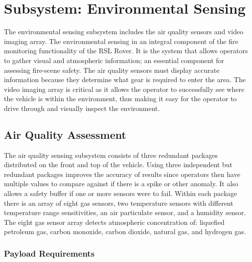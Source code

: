 \chapter{Subsystem: Environmental Sensing}

The environmental sensing subsystem includes the air quality sensors and video imaging array. The environmental sensing in an integral component of the fire monitoring functionality of the RSL Rover. It is the system that allows operators to gather visual and atmospheric information; an essential component for assessing fire-scene safety. The air quality sensors must display accurate information because they determine what gear is required to enter the area. The video imaging array is critical as it allows the operator to successfully see where the vehicle is within the environment, thus making it easy for the operator to drive through and visually inspect the environment. 

\section{Air Quality Assessment}

The air quality sensing subsystem consists of three redundant packages distributed on the front and top of the vehicle. Using three independent but redundant packages improves the accuracy of results since operators then have multiple values to compare against if there is a spike or other anomaly. It also allows a safety buffer if one or more sensors were to fail. Within each package there is an array of eight gas sensors, two temperature sensors with different temperature range sensitivities, an air particulate sensor, and a humidity sensor. The eight gas sensor array detects atmospheric concentration of: liquefied petroleum gas, carbon monoxide, carbon dioxide, natural gas, and hydrogen gas.

\subsection{Payload Requirements}

